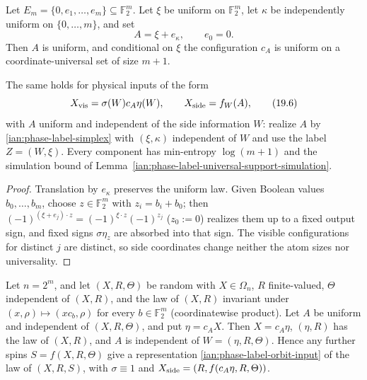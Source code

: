 \begin{proposition}
\label{ian:phase-label-simplex-decomposition}
Let \(E_m=\{0,e_1,\ldots,e_m\}\subseteq\mathbb F_2^m\). Let \(\xi\) be
uniform on \(\mathbb F_2^m\), let \(\kappa\) be independently uniform on
\(\{0,\ldots,m\}\), and set
\[
 A=\xi+e_\kappa,\qquad e_0=0.
 \tag{19.5}\label{ian:phase-label-simplex}
\]
Then \(A\) is uniform, and conditional on \(\xi\) the configuration
\(c_A\) is uniform on a coordinate-universal set of size \(m+1\).

The same holds for physical inputs of the form
\[
 X_{\rm vis}=\sigma(W)c_A\eta(W),\qquad
 X_{\rm side}=f_W(A),
 \tag{19.6}\label{ian:phase-label-orbit-input}
\]
with \(A\) uniform and independent of the side information \(W\): realize
\(A\) by \eqref{ian:phase-label-simplex} with \((\xi,\kappa)\) independent
of \(W\) and use the label \(Z=(W,\xi)\). Every component has
min-entropy \(\log(m+1)\) and the simulation bound of
Lemma~\ref{ian:phase-label-universal-support-simulation}.
\end{proposition}

\begin{proof}
Translation by \(e_\kappa\) preserves the uniform law. Given Boolean
values \(b_0,\ldots,b_m\), choose \(z\in\mathbb F_2^m\) with
\(z_i=b_i+b_0\); then \((-1)^{(\xi+e_j)\cdot z}=(-1)^{\xi\cdot z}(-1)^{z_j}\)
(\(z_0:=0\)) realizes them up to a fixed output sign, and fixed signs
\(\sigma\eta_z\) are absorbed into that sign. The visible configurations
for distinct \(j\) are distinct, so side coordinates change neither the
atom sizes nor universality.
\end{proof}

\begin{lemma}
\label{ian:phase-label-character-randomization}
Let \(n=2^m\), and let \((X,R,\Theta)\) be random with \(X\in\Omega_n\),
\(R\) finite-valued, \(\Theta\) independent of \((X,R)\), and the law of
\((X,R)\) invariant under \((x,\rho)\mapsto(xc_b,\rho)\) for every
\(b\in\mathbb F_2^m\) (coordinatewise product). Let \(A\) be uniform and
independent of \((X,R,\Theta)\), and put \(\eta=c_AX\). Then \(X=c_A\eta\),
\((\eta,R)\) has the law of \((X,R)\), and \(A\) is independent of
\(W=(\eta,R,\Theta)\). Hence any further spins \(S=f(X,R,\Theta)\) give a
representation \eqref{ian:phase-label-orbit-input} of the law of
\((X,R,S)\), with \(\sigma\equiv1\) and \(X_{\rm side}=(R,f(c_A\eta,R,\Theta))\).
\end{lemma}

